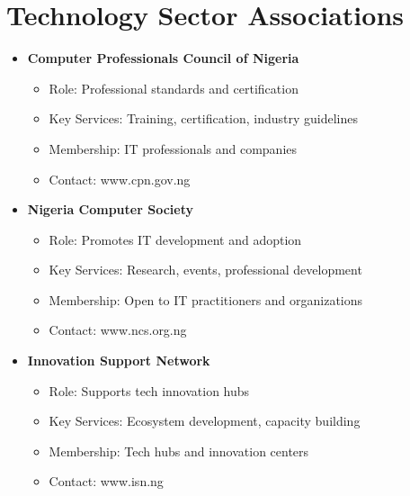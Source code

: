 \section{Technology Sector Associations}\label{sec:tech-associations}
\vspace{1em}

\begin{tcolorbox}[
    colback=white,
    colframe=primarydark,
    title=\textbf{Technology Industry Groups},
    before skip=1em,
    after skip=1em
]
    \begin{itemize}[leftmargin=*,itemsep=0.5em]
        \item \textbf{Computer Professionals Council of Nigeria}
        \begin{itemize}[itemsep=0.3em]
            \item Role: Professional standards and certification
            \item Key Services: Training, certification, industry guidelines
            \item Membership: IT professionals and companies
            \item Contact: www.cpn.gov.ng
        \end{itemize}

        \vspace{0.5em}

        \item \textbf{Nigeria Computer Society}
        \begin{itemize}[itemsep=0.3em]
            \item Role: Promotes IT development and adoption
            \item Key Services: Research, events, professional development
            \item Membership: Open to IT practitioners and organizations
            \item Contact: www.ncs.org.ng
        \end{itemize}

        \vspace{0.5em}

        \item \textbf{Innovation Support Network}
        \begin{itemize}[itemsep=0.3em]
            \item Role: Supports tech innovation hubs
            \item Key Services: Ecosystem development, capacity building
            \item Membership: Tech hubs and innovation centers
            \item Contact: www.isn.ng
        \end{itemize}
    \end{itemize}
\end{tcolorbox}

